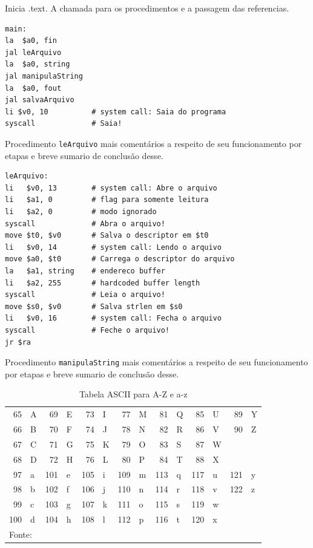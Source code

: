 \documentclass[12pt,a4paper]{article}
\numberwithin{figure}{subsection}
\numberwithin{table}{subsection}
\begin{document}
Inicia .text. A chamada para os procedimentos e a passagem das referencias.

\vspace{-0.5cm}
\begin{lstlisting}[caption={main}]
main:
la  $a0, fin
jal leArquivo
la  $a0, string
jal manipulaString
la  $a0, fout
jal salvaArquivo
li $v0, 10          # system call: Saia do programa
syscall             # Saia!
\end{lstlisting}

Procedimento \texttt{leArquivo} mais comentários a respeito de seu funcionamento por etapas e breve sumario de conclusão desse.

\vspace{-0.5cm}
\begin{lstlisting}[caption={leArquivo}]
leArquivo:
li   $v0, 13        # system call: Abre o arquivo
li   $a1, 0         # flag para somente leitura
li   $a2, 0         # modo ignorado
syscall             # Abra o arquivo!
move $t0, $v0       # Salva o descriptor em $t0
li   $v0, 14        # system call: Lendo o arquivo
move $a0, $t0       # Carrega o descriptor do arquivo
la   $a1, string    # endereco buffer
li   $a2, 255       # hardcoded buffer length
syscall             # Leia o arquivo!
move $s0, $v0       # Salva strlen em $s0
li   $v0, 16        # system call: Fecha o arquivo
syscall             # Feche o arquivo!
jr $ra
\end{lstlisting}


Procedimento \texttt{manipulaString} mais comentários a respeito de seu funcionamento por etapas e breve sumario de conclusão desse.

\lipsum[1]

\begin{table}[H]
	\renewcommand{\arraystretch}{1}
	\centering
	\caption{Tabela ASCII para A-Z e a-z}
	\label{tab:ascii}
	\begin{tabular}{rl|rl|rl|rl|rl|rl|rl}
		\toprule
		 65 & A &  69 & E &  73 & I &  77 & M &  81 & Q &  85 & U &  89 & Y \\
		 66 & B &  70 & F &  74 & J &  78 & N &  82 & R &  86 & V &  90 & Z \\
		 67 & C &  71 & G &  75 & K &  79 & O &  83 & S &  87 & W &     &   \\
		 68 & D &  72 & H &  76 & L &  80 & P &  84 & T &  88 & X &     &   \\
		\midrule
		 97 & a & 101 & e & 105 & i & 109 & m & 113 & q & 117 & u & 121 & y \\
		 98 & b & 102 & f & 106 & j & 110 & n & 114 & r & 118 & v & 122 & z \\
		 99 & c & 103 & g & 107 & k & 111 & o & 115 & s & 119 & w &     &   \\
		100 & d & 104 & h & 108 & l & 112 & p & 116 & t & 120 & x &     &   \\
		\bottomrule
		\multicolumn{12}{l}{\footnotesize Fonte: \citet*{wiki:xxx}}
	\end{tabular}
\end{table}
\end{document}
